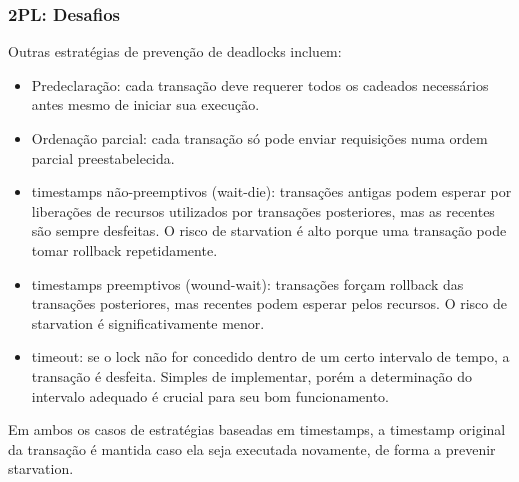 \documentclass{beamer}
\begin{document}

\begin{frame}
\frametitle{2PL: Desafios}

Outras estratégias de prevenção de deadlocks incluem:

\begin{itemize}
    \item Predeclaração: cada transação deve requerer todos os cadeados necessários antes mesmo de iniciar sua execução.
    \item Ordenação parcial: cada transação só pode enviar requisições numa ordem parcial preestabelecida.
    \item timestamps não-preemptivos (wait-die): transações antigas podem esperar por liberações de recursos utilizados por transações posteriores, mas as recentes são sempre desfeitas. O risco de starvation é alto porque uma transação pode tomar rollback repetidamente.
    \item timestamps preemptivos (wound-wait): transações forçam rollback das transações posteriores, mas recentes podem esperar pelos recursos. O risco de starvation é significativamente menor.
    \item timeout: se o lock não for concedido dentro de um certo intervalo de tempo, a transação é desfeita. Simples de implementar, porém a determinação do intervalo adequado é crucial para seu bom funcionamento.
\end{itemize}

Em ambos os casos de estratégias baseadas em timestamps, a timestamp original da transação é mantida caso ela seja executada novamente, de forma a prevenir starvation.
\end{frame}

\end{document}
